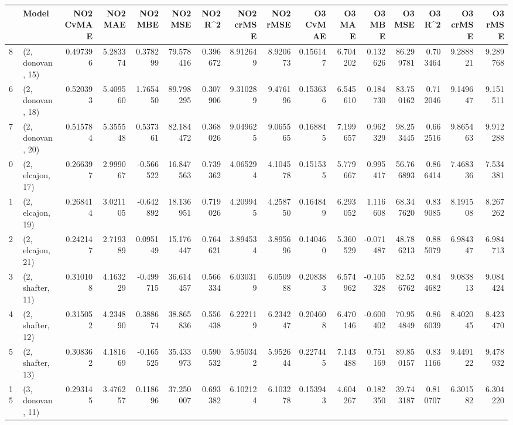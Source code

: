 \begin{tabular}{llrrrrrrrrrrrrrr}
\toprule
{} &             Model &  NO2 CvMAE &   NO2 MAE &   NO2 MBE &    NO2 MSE &   NO2 R\textasciicircum2 &  NO2 crMSE &  NO2 rMSE &  O3 CvMAE &    O3 MAE &    O3 MBE &      O3 MSE &    O3 R\textasciicircum2 &   O3 crMSE &    O3 rMSE \\
\midrule
8  &  (2, donovan, 15) &   0.497396 &  5.283374 &  0.378299 &  79.578416 &  0.396672 &   8.912649 &  8.920673 &  0.156147 &  6.704202 &  0.132626 &   86.299781 &  0.703464 &   9.288821 &   9.289768 \\
6  &  (2, donovan, 18) &   0.520393 &  5.409560 &  1.765450 &  89.798295 &  0.307906 &   9.310289 &  9.476196 &  0.153636 &  6.545610 &  0.184730 &   83.750162 &  0.712046 &   9.149647 &   9.151511 \\
7  &  (2, donovan, 20) &   0.515784 &  5.355548 &  0.537361 &  82.184472 &  0.368026 &   9.049625 &  9.065565 &  0.168845 &  7.199657 &  0.962329 &   98.253445 &  0.662516 &   9.865463 &   9.912288 \\
0  &  (2, elcajon, 17) &   0.266397 &  2.999067 & -0.566522 &  16.847563 &  0.739362 &   4.065294 &  4.104578 &  0.151535 &  5.779667 &  0.995417 &   56.766893 &  0.866414 &   7.468336 &   7.534381 \\
1  &  (2, elcajon, 19) &   0.268414 &  3.021105 & -0.642892 &  18.136951 &  0.719026 &   4.209945 &  4.258750 &  0.164849 &  6.293052 &  1.116608 &   68.347620 &  0.839085 &   8.191508 &   8.267262 \\
2  &  (2, elcajon, 21) &   0.242147 &  2.719389 &  0.095149 &  15.176447 &  0.764621 &   3.894534 &  3.895696 &  0.140460 &  5.360529 & -0.071487 &   48.786213 &  0.885079 &   6.984347 &   6.984713 \\
3  &  (2, shafter, 11) &   0.310108 &  4.163229 & -0.499715 &  36.614457 &  0.566334 &   6.030319 &  6.050988 &  0.208383 &  6.574962 & -0.105328 &   82.526762 &  0.844682 &   9.083813 &   9.084424 \\
4  &  (2, shafter, 12) &   0.315052 &  4.234890 &  0.388674 &  38.865836 &  0.556438 &   6.222119 &  6.234247 &  0.204608 &  6.470146 & -0.600402 &   70.954849 &  0.866039 &   8.402045 &   8.423470 \\
5  &  (2, shafter, 13) &   0.308362 &  4.181669 & -0.165525 &  35.433973 &  0.590532 &   5.950342 &  5.952644 &  0.227445 &  7.143488 &  0.751169 &   89.850157 &  0.831166 &   9.449122 &   9.478932 \\
15 &  (3, donovan, 11) &   0.293145 &  3.476257 &  0.118696 &  37.250007 &  0.693382 &   6.102124 &  6.103278 &  0.153943 &  4.604267 &  0.182350 &   39.743187 &  0.810707 &   6.301582 &   6.304220 \\

\end{tabular}
